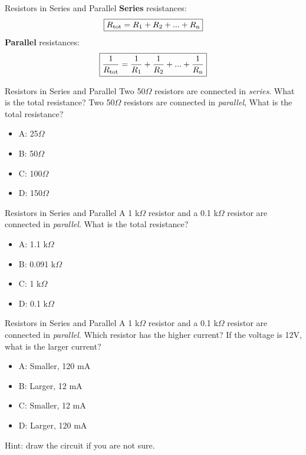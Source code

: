 \documentclass{beamer}
\begin{document}
\begin{frame}{Resistors in Series and Parallel}
\textbf{\alert{Series}} resistances:
\begin{equation}
\boxed{R_{\rm tot} = R_{\rm 1} + R_{\rm 2} + ... + R_{\rm n}}
\end{equation}
\textbf{\alert{Parallel}} resistances:
\begin{equation}
\boxed{\frac{1}{R_{\rm tot}} = \frac{1}{R_{\rm 1}} + \frac{1}{R_{\rm 2}} + ... + \frac{1}{R_{\rm n}}}
\end{equation}
\end{frame}

\begin{frame}{Resistors in Series and Parallel}
Two 50$\Omega$ resistors are connected in \textit{series}.  What is the total resistance?  Two 50$\Omega$ resistors are connected in \textit{parallel},  What is the total resistance?
\begin{itemize}
\item A: 25$\Omega$
\item B: 50$\Omega$
\item C: 100$\Omega$
\item D: 150$\Omega$
\end{itemize}
\end{frame}

\begin{frame}{Resistors in Series and Parallel}
A 1 k$\Omega$ resistor and a 0.1 k$\Omega$ resistor are connected in \textit{parallel}.  What is the total resistance?
\begin{itemize}
\item A: 1.1 k$\Omega$
\item B: 0.091 k$\Omega$
\item C: 1 k$\Omega$
\item D: 0.1 k$\Omega$
\end{itemize}
\end{frame}

\begin{frame}{Resistors in Series and Parallel}
A 1 k$\Omega$ resistor and a 0.1 k$\Omega$ resistor are connected in \textit{parallel}.  Which resistor has the higher current?  If the voltage is 12V, what is the larger current?
\begin{itemize}
\item A: Smaller, 120 mA
\item B: Larger, 12 mA
\item C: Smaller, 12 mA
\item D: Larger, 120 mA
\end{itemize}
\footnotesize{Hint: draw the circuit if you are not sure.}
\end{frame}
\end{document}
